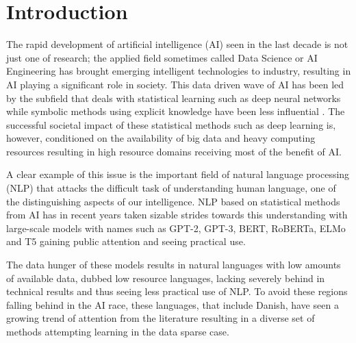 \documentclass[main.tex]{subfiles}
\begin{document}
\chapter{Introduction}
The rapid development of artificial intelligence (AI) seen in the last decade is not just one of research;
the applied field sometimes called Data Science or AI Engineering has brought emerging intelligent technologies to industry, resulting in AI playing a significant role in society.
This data driven wave of AI has been led by the subfield that deals with statistical learning such as deep neural networks while symbolic methods using explicit knowledge have been less influential \cite{lecun2015deep}.
The successful societal impact of these statistical methods such as deep learning is, however, conditioned on the availability of big data and heavy computing resources resulting in high resource domains receiving most of the benefit of AI.

A clear example of this issue is the important field of natural language processing (NLP) that attacks the difficult task of understanding human language, one of the distinguishing aspects of our intelligence.
NLP based on statistical methods from AI has in recent years taken sizable strides towards this understanding with large-scale models with names such as GPT-2, GPT-3, BERT, RoBERTa, ELMo and T5 gaining public attention and seeing practical use.

The data hunger of these models results in natural languages with low amounts of available data, dubbed low resource languages, lacking severely behind in technical results and thus seeing less practical use of NLP.
To avoid these regions falling behind in the AI race, these languages, that include Danish, have seen a growing trend of attention from the literature resulting in a diverse set of methods attempting learning in the data sparse case. \cite{hedderich2021survey}
\end{document}
